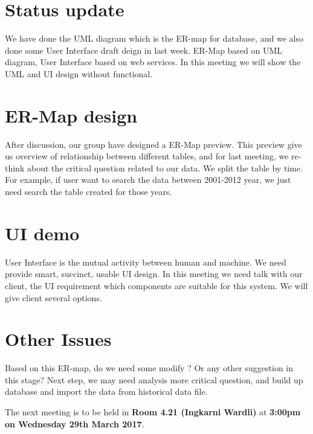 \documentclass[11pt, a4paper]{article}
\begin{document}

\section{Status update}

We have done the UML diagram which is the ER-map for database, and we also done some User Interface draft deign in last week. ER-Map based on UML diagram, User Interface based on web services. In this meeting we will show the UML and UI design without functional.


\section{ER-Map design}

After discussion, our group have designed a ER-Map preview. This preview give us overview of relationship between different tables, and for last meeting,  we re-think about the critical question related to our data. We split  the table by time. For example, if user want to search the data between 2001-2012 year, we just need search the table created for those years.


\section{UI demo}

User Interface is the mutual activity between human and machine. We need provide smart, succinct, usable UI design. In this meeting we need talk with our client, the UI requirement which components are suitable for this system. We will give client several options.



\section{Other Issues}

Based on this ER-map, do we need some modify ? Or any other suggestion in this stage? Next step, we may need analysis more critical question, and build up database and import the data from historical data file.


\vspace*{10pt}

\noindent The next meeting is to be held in {\bf Room 4.21 (Ingkarni Wardli)} at {\bf 3:00pm on Wednesday 29th March 2017}.
\end{document}
